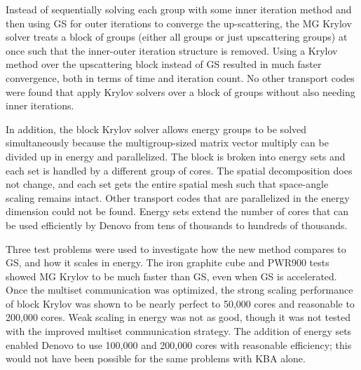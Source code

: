 Instead of sequentially solving each group with some inner iteration method and then using GS for outer iterations to converge the up-scattering, the MG Krylov solver treats a block of groups (either all groups or just upscattering groups) at once such that the inner-outer iteration structure is removed. Using a Krylov method over the upscattering block instead of GS resulted in much faster convergence, both in terms of time and iteration count. No other transport codes were found that apply Krylov solvers over a block of groups without also needing inner iterations. 

In addition, the block Krylov solver allows energy groups to be solved simultaneously because the multigroup-sized matrix vector multiply can be divided up in energy and parallelized. The block is broken into energy sets and each set is handled by a different group of cores. The spatial decomposition does not change, and each set gets the entire spatial mesh such that space-angle scaling remains intact.  Other \Sn transport codes that are parallelized in the energy dimension could not be found. Energy sets extend the number of cores that can be used efficiently by Denovo from tens of thousands to hundreds of thousands. 

Three test problems were used to investigate how the new method compares to GS, and how it scales in energy. The iron graphite cube and PWR900 tests showed MG Krylov to be much faster than GS, even when GS is accelerated. Once the multiset communication was optimized, the strong scaling performance of block Krylov was shown to be nearly perfect to 50,000 cores and reasonable to 200,000 cores. Weak scaling in energy was not as good, though it was not tested with the improved multiset communication strategy. The addition of energy sets enabled Denovo to use 100,000 and 200,000 cores with reasonable efficiency; this would not have been possible for the same problems with KBA alone. 


